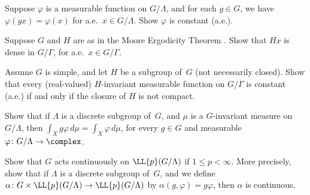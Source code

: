 \begin{exercises}
\item \label{InvtOnTrans}
Suppose $\varphi$ is a measurable function on $G/\Lambda$, and for each $g \in G$, we have $\varphi(gx) = \varphi(x)$ for a.e.\ $x \in G/\Lambda$. Show $\varphi$ is constant (a.e.).

\item Suppose $G$ and $H$ are as in the Moore Ergodicity Theorem .
Show that $Hx$ is dense in $G/\Gamma$, for a.e.\ $x \in G/\Gamma$.

\item Assume $G$ is simple, and let $H$ be a subgroup of~$G$ (not necessarily closed). Show that every (real-valued) $H$-invariant measurable function on $G/\Gamma$ is constant (a.e.) if and only if the closure of $H$ is not compact.

\item \label{TranslateHasSameIntegral}
Show that if $\Lambda$ is a discrete subgroup of~$G$, and $\mu$ is a $G$-invariant measure on $G/\Lambda$, then $\int_X g\varphi \, d\mu = \int_X \varphi \, d\mu$, for every $g \in G$ and measurable $\varphi \colon G/\Lambda \to \complex$.

\item \label{GContOnLp}
Show that $G$ acts continuously on $\LL{p}(G/\Lambda)$ if $1 \le p < \infty$. More precisely, show that if $\Lambda$ is a discrete subgroup of~$G$, and we define $\alpha \colon G \times \LL{p}(G/\Lambda) \to \LL{p}(G/\Lambda)$ by $\alpha(g,\varphi) = g\varphi$, then $\alpha$ is continuous.

\end{exercises}







